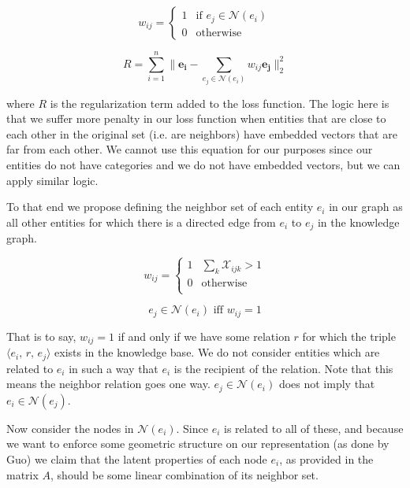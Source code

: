 \documentclass[pageno]{jpaper}
\begin{document}
$$
w_{ij} =
\begin{cases}
    1 & \text{if } e_j \in \mathcal{N}(e_i) \\
    0 & \text{otherwise}
\end{cases}
$$

$$R = \sum_{i=1}^n \lVert \mathbf{e_i} - \sum_{e_j \in \mathcal{N}(e_i)} w_{ij}
\mathbf{e_j} \rVert_2^2$$

where $R$ is the regularization term added to the loss function. The logic here
is that we suffer more penalty in our loss function when entities that are close
to each other in the original set (i.e. are neighbors) have embedded vectors
that are far from each other. We cannot use this equation for our purposes since
our entities do not have categories and we do not have embedded vectors, but we
can apply similar logic.

To that end we propose defining the neighbor set of each entity $e_i$ in our graph
as all other entities for which there is a directed edge from $e_i$ to $e_j$ in
the knowledge graph.

\begin{equation}
    \label{eq: new wij}
    w_{ij} =
    \begin{cases}
        1 & \sum_k \mathcal{X}_{ijk} > 1 \\
        0 & \text{otherwise} \\
    \end{cases}
\end{equation}

\begin{equation}
    \label{eq: new neighbor set}
    e_j \in \mathcal{N}(e_i) \text{ iff } w_{ij} = 1
\end{equation}

That is to say, $w_{ij} = 1$ if and only if we have some relation $r$ for which
the triple $\langle e_i,\,r,\,e_j \rangle$ exists in the knowledge base. We do
not consider entities which are related to $e_i$ in such a way that $e_i$ is the
recipient of the relation. Note that this means the neighbor relation goes one
way. $e_j \in \mathcal{N}(e_i)$ does not imply that $e_i \in \mathcal{N}(e_j)$.

Now consider the nodes in $\mathcal{N}(e_i)$. Since $e_i$ is related to all of
these, and because we want to enforce some geometric structure on our
representation (as done by Guo) we claim that the latent properties of each node
$e_i$, as provided in the matrix $A$, should be some linear combination of its
neighbor set.
\end{document}
